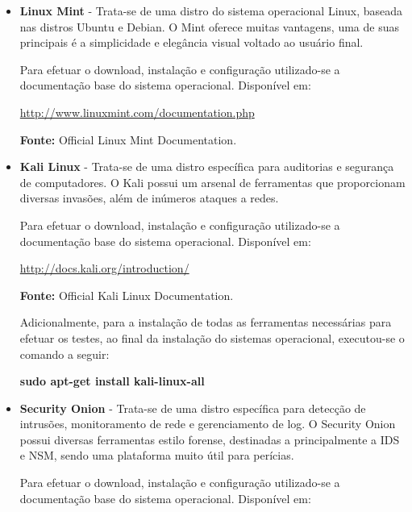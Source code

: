 			\begin{itemize}

				\item \textbf{Linux Mint} - Trata-se de uma distro do sistema operacional Linux, baseada nas distros Ubuntu e Debian. O Mint oferece muitas vantagens, uma de suas principais é a simplicidade e elegância visual voltado ao usuário final. \cite{mint}

				Para efetuar o download, instalação e configuração utilizado-se a documentação base do sistema operacional. Disponível em:

				\begin{framed}
					\href{http://www.linuxmint.com/documentation.php}{http://www.linuxmint.com/documentation.php}
				\end{framed}
				\textbf{Fonte:} Official Linux Mint Documentation.


				\item \textbf{Kali Linux} - Trata-se de uma distro específica para auditorias e segurança de computadores. O Kali possui um arsenal de ferramentas que proporcionam diversas invasões, além de inúmeros ataques a redes. \cite{kali}

				Para efetuar o download, instalação e configuração utilizado-se a documentação base do sistema operacional. Disponível em:

				\begin{framed}
					\href{http://docs.kali.org/introduction/}{http://docs.kali.org/introduction/}
				\end{framed}
				\textbf{Fonte:} Official Kali Linux Documentation.

				Adicionalmente, para a instalação de todas as ferramentas necessárias para efetuar os testes, ao final da instalação do sistemas operacional, executou-se o comando a seguir:

				\begin{framed}
					\textbf{sudo apt-get install kali-linux-all}
				\end{framed}


				\item \textbf{Security Onion} - Trata-se de uma distro específica para detecção de intrusões, monitoramento de rede e gerenciamento de log. O Security Onion possui diversas ferramentas estilo forense, destinadas a principalmente a IDS e NSM, sendo uma plataforma muito útil para perícias. \cite{SO}

				Para efetuar o download, instalação e configuração utilizado-se a documentação base do sistema operacional. Disponível em:


\end{itemize}
